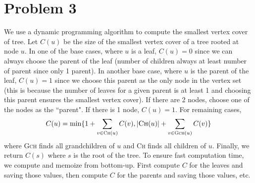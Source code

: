 \documentclass{article}
\begin{document}
\section*{Problem 3}
We use a dynamic programming algorithm to compute the smallest vertex cover of tree. Let $C(u)$ be the size of the smallest vertex cover of a tree rooted at node $u$. In one of the base cases, where $u$ is a leaf, $C(u)=0$ since we can always choose the parent of the leaf (number of children always at least number of parent since only 1 parent). In another base case, where $u$ is the parent of the leaf, $C(u)=1$ since we choose this parent as the only node in the vertex set (this is because the number of leaves for a given parent is at least 1 and choosing this parent ensures the smallest vertex cover). If there are 2 nodes, choose one of the nodes as the ``parent". If there is 1 node, $C(u)=1$. For remaining cases,
$$C(u) = \min \{ 1+\sum_{v\in \textsc{Ch}(u)} C(v), |\textsc{Ch}(u)| + \sum_{v\in \textsc{Gch}(u)} C(v)   \}$$
where \textsc{Gch} finds all grandchildren of $u$ and \textsc{Ch} finds all children of $u$. Finally, we return $C(s)$ where $s$ is the root of the tree. To ensure fast computation time, we compute and memoize from bottom-up. First compute $C$ for the leaves and saving those values, then compute $C$ for the parents and saving those values, etc.
\end{document}
